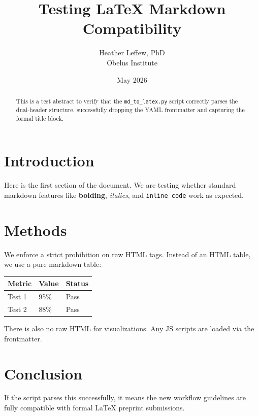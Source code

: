 \documentclass{obelus-preprint}
\title{Testing LaTeX Markdown Compatibility}
\author{Heather Leffew, PhD\\Obelus Institute}
\date{May 2026}
\begin{document}
\maketitle

\begin{abstract}
This is a test abstract to verify that the \texttt{md\_to\_latex.py} script correctly parses the dual-header structure, successfully dropping the YAML frontmatter and capturing the formal title block.
\end{abstract}
\section{Introduction}
Here is the first section of the document. We are testing whether standard markdown features like \textbf{bolding}, \emph{italics}, and \texttt{inline code} work as expected.
\section{Methods}
We enforce a strict prohibition on raw HTML tags. Instead of an HTML table, we use a pure markdown table:
\begin{center}
\begin{tabular}{lll}
\toprule
\textbf{Metric} & \textbf{Value} & \textbf{Status} \\
\midrule
Test 1 & 95\% & Pass \\
Test 2 & 88\% & Pass \\
\bottomrule
\end{tabular}
\end{center}
There is also no raw HTML for visualizations. Any JS scripts are loaded via the frontmatter.
\section{Conclusion}
If the script parses this successfully, it means the new workflow guidelines are fully compatible with formal LaTeX preprint submissions.
\end{document}
